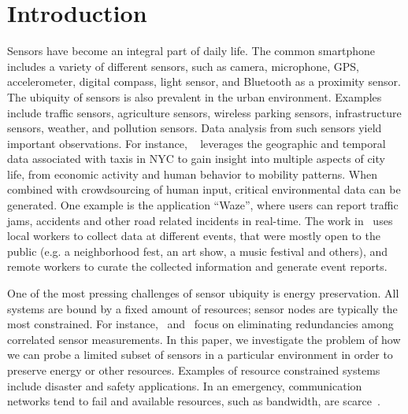 \documentclass{acm_proc_article-sp}
\begin{document}
\section{Introduction}
Sensors have become an integral part of daily life. The common smartphone includes a variety of different sensors, such as camera, microphone, GPS, accelerometer, digital compass, light sensor, and Bluetooth as a proximity sensor. The ubiquity of sensors is also prevalent in the urban environment. Examples include traffic sensors, agriculture sensors, wireless parking sensors, infrastructure sensors, weather, and pollution sensors. Data analysis from such sensors yield important observations. For instance, ~\cite{ferreira2013visual} leverages the geographic and temporal data associated with taxis in NYC to gain insight into multiple aspects of city life, from economic activity and human behavior to mobility patterns. When combined with crowdsourcing of human input, critical environmental data can be generated. One example is the application ``Waze'', where users can report traffic jams, accidents and other road related incidents in real-time. The work in~\cite{agapie2015crowdsourcing} uses local workers to collect data at different events, that were mostly open to the public (e.g. a neighborhood fest, an art show, a music festival and others), and remote workers to curate the collected information and generate event reports.\par

One of the most pressing challenges of sensor ubiquity is energy preservation. All systems are bound by a fixed amount of resources; sensor nodes are typically the most constrained. For instance,~\cite{marco2003many} and~\cite{pattem2008impact} focus on eliminating redundancies among correlated sensor measurements. In this paper, we investigate the problem of how we can probe a limited subset of sensors in a particular environment in order to preserve energy or other resources. Examples of resource constrained systems include disaster and safety applications. In an emergency, communication networks tend to fail and available resources, such as bandwidth, are scarce~\cite{manoj2007communication}.\par
\end{document}
